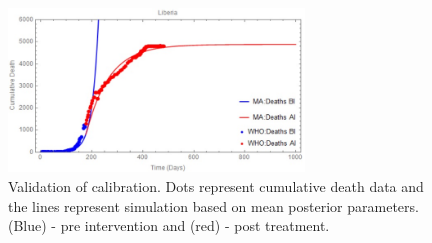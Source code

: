 \begin{figure}
  \centering
  \includegraphics[width=0.7\textwidth]{CumulativeDeathMathematica}
  \caption{Validation of calibration. Dots represent cumulative death data and the lines represent simulation based on mean posterior parameters. (Blue) - pre intervention and (red) - post treatment.}
\label{fig:Cumulative Death Plot}
\end{figure}
